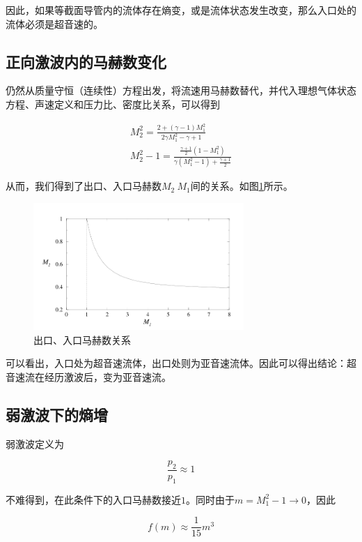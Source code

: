 因此，如果等截面导管内的流体存在熵变，或是流体状态发生改变，那么入口处的流体必须是超音速的。

\subsection{正向激波内的马赫数变化}

仍然从质量守恒（连续性）方程出发，将流速用马赫数替代，并代入理想气体状态方程、声速定义和压力比、密度比关系，可以得到

\begin{align*}
    M_{2}^{2}=\frac{2+(\gamma-1) M_{1}^{2}}{2 \gamma M_{1}^{2}-\gamma+1}\\ 
    M_{2}^{2}-1=\frac{\frac{\gamma+1}{2}\left(1-M_{1}^{2}\right)}{\gamma\left(M_{1}^{2}-1\right)+\frac{\gamma+1}{2}}
\end{align*}

从而，我们得到了出口、入口马赫数$M_2\ M_1$间的关系。如图\ref{2}所示。

\begin{figure}[!ht]
    \centering
    \includegraphics[width=8cm]{figures/2.png}
    \caption{出口、入口马赫数关系}
    \label{2}
\end{figure}

可以看出，入口处为超音速流体，出口处则为亚音速流体。因此可以得出结论：超音速流在经历激波后，变为亚音速流。

\subsection{弱激波下的熵增}

弱激波定义为

\begin{equation*}
    \frac{p_{2}}{p_{1}} \approx 1
\end{equation*}

不难得到，在此条件下的入口马赫数接近$1$。同时由于$m=M_1^2-1\rightarrow0$，因此

\begin{equation*}
    f(m) \approx \frac{1}{15} m^{3}
\end{equation*}

